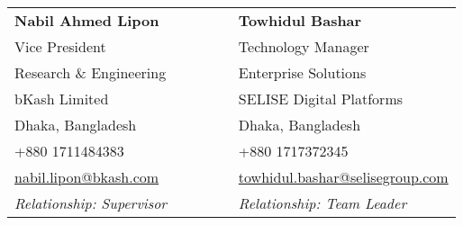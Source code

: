 {\begin{tabular}{@{} p{0.5\linewidth} | p{0.5\linewidth} @{}}
    \vspace{0.04mm}
    \textbf{Nabil Ahmed Lipon} & \vspace{0.04mm} \hspace{4mm}\textbf{Towhidul Bashar} \\
    \small{Vice President} & \hspace{4mm}\small{Technology Manager} \\
    \small{Research \& Engineering} & \hspace{4mm}\small{Enterprise Solutions} \\
    \small{bKash Limited} & \hspace{4mm}\small{SELISE Digital Platforms} \\
    \small{Dhaka, Bangladesh} & \hspace{4mm}\small{Dhaka, Bangladesh} \\
    \small{+880 1711484383} & \hspace{4mm}\small{+880 1717372345} \\
    \small{\href{mailto:nabil.lipon@bkash.com}{nabil.lipon@bkash.com}} & \hspace{4mm}\small{\href{mailto:towhidul.bashar@selisegroup.com}{towhidul.bashar@selisegroup.com}} \\
    \small{\textit{Relationship: Supervisor}} & \hspace{4mm}\small{\textit{Relationship: Team Leader}} \\
    
    
\end{tabular}
}
